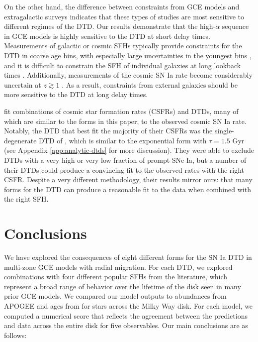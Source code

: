 \documentclass[twocolumn,twocolappendix]{aastex631}
\begin{document}
On the other hand, the difference between constraints from GCE models and extragalactic surveys indicates that these types of studies are most sensitive to different regimes of the DTD. Our results demonstrate that the high-$\alpha$ sequence in GCE models is highly sensitive to the DTD at short delay times. Measurements of galactic or cosmic SFHs typically provide constraints for the DTD in coarse age bins, with especially large uncertainties in the youngest bins \citep[e.g.,][]{MaozMannucci2012-SNeIaReview}, and it is difficult to constrain the SFH of individual galaxies at long lookback times \citep{Conroy2013-PanchromaticSED}. Additionally, measurements of the cosmic SN Ia rate become considerably uncertain at $z\gtrsim1$ \citep[see, e.g.,][]{Palicio2024-CosmicSNIaRate}. As a result, constraints from external galaxies should be more sensitive to the DTD at long delay times.

\citet{Palicio2024-CosmicSNIaRate} fit combinations of cosmic star formation rates (CSFRs) and DTDs, many of which are similar to the forms in this paper, to the observed cosmic SN Ia rate. Notably, the DTD that best fit the majority of their CSFRs was the single-degenerate DTD of \citet{MatteucciRecchi2001-SNIaTimescale}, which is similar to the exponential form with $\tau=1.5$ Gyr (see Appendix \ref{app:analytic-dtds} for more discussion). They were able to exclude DTDs with a very high or very low fraction of prompt SNe Ia, but a number of their DTDs could produce a convincing fit to the observed rates with the right CSFR. Despite a very different methodology, their results mirror ours: that many forms for the DTD can produce a reasonable fit to the data when combined with the right SFH. 

\section{Conclusions}
\label{sec:conclusions}

We have explored the consequences of eight different forms for the SN Ia DTD in multi-zone GCE models with radial migration. For each DTD, we explored combinations with four different popular SFHs from the literature, which represent a broad range of behavior over the lifetime of the disk seen in many prior GCE models. We compared our model outputs to abundances from APOGEE and ages from  for stars across the Milky Way disk. For each model, we computed a numerical score that reflects the agreement between the predictions and data across the entire disk for five observables. Our main conclusions are as follows:
\end{document}
